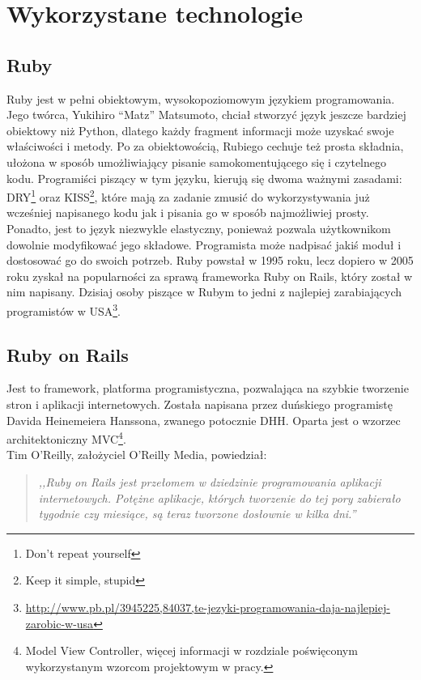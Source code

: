 \section{Wykorzystane technologie}
  \subsection{Ruby}
  Ruby jest w pełni obiektowym, wysokopoziomowym językiem programowania. Jego twórca, Yukihiro “Matz” Matsumoto, chciał stworzyć język jeszcze bardziej obiektowy niż Python, dlatego każdy fragment informacji może uzyskać swoje właściwości i metody. Po za obiektowością, Rubiego cechuje też prosta składnia, ułożona w sposób umożliwiający pisanie samokomentującego się i czytelnego kodu. Programiści piszący w tym języku, kierują się dwoma ważnymi zasadami: DRY\footnote{Don't repeat yourself} oraz KISS\footnote{Keep it simple, stupid}, które mają za zadanie zmusić do wykorzystywania już wcześniej napisanego kodu jak i pisania go w sposób najmożliwiej prosty. Ponadto, jest to język niezwykle elastyczny, ponieważ pozwala użytkownikom dowolnie modyfikować jego składowe. Programista może nadpisać jakiś moduł i dostosować go do swoich potrzeb. Ruby powstał w 1995 roku, lecz dopiero w 2005 roku zyskał na popularności za sprawą frameworka Ruby on Rails, który został w nim napisany. Dzisiaj osoby piszące w Rubym to jedni z najlepiej zarabiających programistów w USA\footnote{\url{http://www.pb.pl/3945225,84037,te-jezyki-programowania-daja-najlepiej-zarobic-w-usa}}.

  \subsection{Ruby on Rails}
  Jest to framework, platforma programistyczna, pozwalająca na szybkie tworzenie stron i aplikacji internetowych. Została napisana przez duńskiego programistę Davida Heinemeiera Hanssona, zwanego potocznie DHH. Oparta jest o wzorzec architektoniczny MVC\footnote{Model View Controller, więcej informacji w rozdziale poświęconym wykorzystanym wzorcom projektowym w pracy.}. \\
  Tim O'Reilly, założyciel O'Reilly Media, powiedział:
  \begin{quote}
    \emph{,,Ruby on Rails jest przełomem w dziedzinie programowania aplikacji internetowych.
    Potężne aplikacje, których tworzenie do tej pory zabierało tygodnie czy miesiące, są teraz tworzone dosłownie w kilka dni.”}
  \end{quote}

